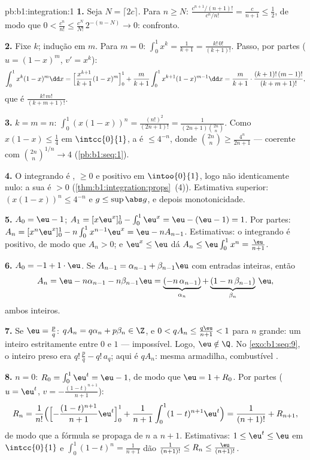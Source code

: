 \begin{solution}{pb:b1:integration:1}
\textbf{1.} Seja $N = \lceil 2c \rceil$. Para $n \geq N$:
$\frac{c^{n+1}/(n+1)!}{c^n/n!} = \frac{c}{n+1} \leq \frac12$, de modo que
$0 < \frac{c^n}{n!} \leq \frac{c^N}{N!}\,2^{-(n - N)} \to 0$:
confronto.

\textbf{2.} Fixe $k$; indução em $m$. Para $m = 0$: $\int_0^1
x^k = \frac{1}{k+1} = \frac{k!\,0!}{(k+1)!}$. Passo, por partes
($u = (1-x)^m$, $v' = x^k$):
\[
\int_0^1 x^k (1-x)^m \dd x
= \Bigl[\frac{x^{k+1}}{k+1}(1-x)^m\Bigr]_0^1
+ \frac{m}{k+1}\int_0^1 x^{k+1}(1-x)^{m-1}\dd x
= \frac{m}{k+1}\cdot\frac{(k+1)!\,(m-1)!}{(k+m+1)!} ,
\]
que é $\frac{k!\,m!}{(k+m+1)!}$.

\textbf{3.} $k = m = n$: $\int_0^1 (x(1-x))^n =
\frac{(n!)^2}{(2n+1)!} = \frac{1}{(2n+1)\binom{2n}{n}}$. Como
$x(1-x) \leq \frac14$ em $\intcc{0}{1}$, a  é $\leq
4^{-n}$, donde $\binom{2n}{n} \geq \frac{4^n}{2n+1}$ ---
coerente com $\binom{2n}{n}^{1/n} \to 4$
(\cref{pb:b1:seq:1}).

\textbf{4.} O integrando é , $\geq 0$ e positivo
em $\intoo{0}{1}$, logo não identicamente nulo: a sua  é
$> 0$ (\cref{thm:b1:integration:props}~(4)). Estimativa superior:
$(x(1-x))^n \leq 4^{-n}$ e $g \leq \sup\abs g$, e depois
monotonicidade.

\textbf{5.} $A_0 = \eu - 1$; $A_1 = [x\eu^x]_0^1 - \int_0^1
\eu^x = \eu - (\eu - 1) = 1$. Por partes: $A_n = [x^n \eu^x]_0^1 -
n\int_0^1 x^{n-1}\eu^x = \eu - n A_{n-1}$. Estimativas: o integrando
é positivo, de modo que $A_n > 0$; e $\eu^x \leq \eu$ dá $A_n \leq
\eu\int_0^1 x^n = \frac{\eu}{n+1}$.

\textbf{6.} $A_0 = -1 + 1\cdot\eu$. Se $A_{n-1} = \alpha_{n-1} +
\beta_{n-1}\eu$ com entradas inteiras, então
\[
A_n = \eu - n\alpha_{n-1} - n\beta_{n-1}\eu
= \underbrace{(-n\,\alpha_{n-1})}_{\alpha_n}
+ \underbrace{(1 - n\,\beta_{n-1})}_{\beta_n}\,\eu ,
\]
ambos inteiros.

\textbf{7.} Se $\eu = \frac pq$: $q A_n = q\alpha_n + p\beta_n
\in \Z$, e $0 < qA_n \leq \frac{q\eu}{n+1} < 1$ para $n$ grande:
um inteiro estritamente entre $0$ e $1$ --- impossível. Logo, $\eu
\notin \Q$. No \cref{exo:b1:seq:9}, o inteiro preso era
$q!\,\frac pq - q!\,a_q$; aqui é $qA_n$: mesma armadilha,
combustível .

\textbf{8.} $n = 0$: $R_0 = \int_0^1 \eu^t = \eu - 1$, de modo que $\eu =
1 + R_0$. Por partes ($u = \eu^t$, $v = -\frac{(1-t)^{n+1}}{n+1}$):
\[
R_n = \frac{1}{n!}\Bigl(\Bigl[-\frac{(1-t)^{n+1}}{n+1}
\eu^t\Bigr]_0^1 + \frac{1}{n+1}\int_0^1 (1-t)^{n+1}\eu^t\Bigr)
= \frac{1}{(n+1)!} + R_{n+1} ,
\]
de modo que a fórmula se propaga de $n$ a $n + 1$. Estimativas: $1 \leq
\eu^t \leq \eu$ em $\intcc{0}{1}$ e $\int_0^1 (1-t)^n =
\frac{1}{n+1}$ dão $\frac{1}{(n+1)!} \leq R_n \leq
\frac{\eu}{(n+1)!}$.


\end{solution}
